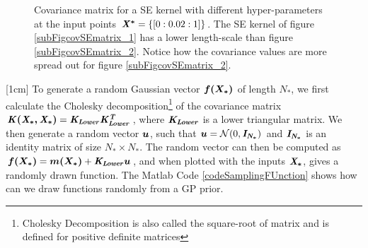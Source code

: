 \begin{figure}[!ht]
  \centering
    \quad
{}\quad
  
       \caption{Covariance matrix for a SE kernel with different hyper-parameters at the input points $\bm{\mathit{X^{*}}} = \{[0:0.02:1]\}$. The SE kernel of figure \ref{subFigcovSEmatrix_1} has a lower length-scale than figure \ref{subFigcovSEmatrix_2}. Notice how the covariance values are more spread out for figure \ref{subFigcovSEmatrix_2}.}\label{figGPCovarianceMatrix}
\end{figure}

[1cm]
To generate a random Gaussian vector $\boldsymbol{f(X_{*})}$ of length $N_{*}$, we first calculate the Cholesky decomposition\footnote{Cholesky Decomposition is also called the square-root of matrix and is defined for positive definite matrices} of the covariance matrix $\bm{\mathit{K(X_{*}, X_{*})}} = \bm{\mathit{K_{Lower}}}\bm{\mathit{K_{Lower}^{T}}}$, where $\bm{\mathit{K_{Lower}}}$ is a lower triangular matrix. We then generate a random vector $\boldsymbol{u}$, such that $\boldsymbol{u} = \mathcal{N}(0, \bm{\mathit{I_{N_*}}})$ and $\bm{\mathit{I_{N_*}}}$ is an identity matrix of size $N_{*} \times N_{*}$.  The random vector can then be computed as $\boldsymbol{f(X_{*})} = \boldsymbol{m(X_{*})} + \bm{\mathit{K_{Lower}}}\boldsymbol{u}$, and when plotted with the inputs $\bm{\mathit{X_{*}}}$, gives a randomly drawn function. The Matlab Code \ref{codeSamplingFUnction} shows how can we draw functions randomly from a GP prior.

